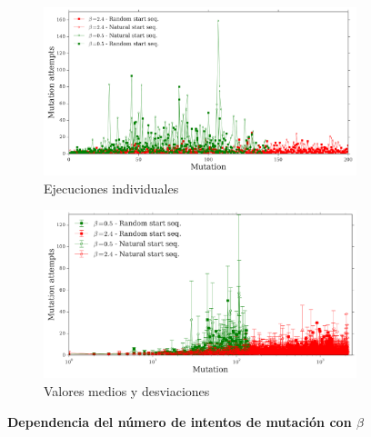 \begin{figure}[htbp]
  \begin{subfigure}[b]{\textwidth}
    \includegraphics[width=\textwidth]{img/resultados/iterationVsMutAttempts-individual.png}
    \caption{Ejecuciones individuales}
    \label{fig:mutAttemptsVsite-a}
  \end{subfigure}
  \begin{subfigure}[b]{\textwidth}
      \includegraphics[width=\textwidth]{img/resultados/iterationVsMutAttempts-mean.png}
    \caption{Valores medios y desviaciones}
  \label{fig:mutAttemptsVsite-b}
  \end{subfigure}
  \caption{\textbf{Dependencia del número de intentos de mutación con $\beta$}}
  \label{fig:mutAttemptsVsite}
\end{figure}









